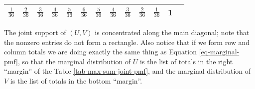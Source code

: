 \documentclass[]{book}
\numberwithin{equation}{chapter}
\numberwithin{figure}{chapter}
\theoremstyle{plain}
\theoremstyle{definition}
\theoremstyle{remark}
\theoremstyle{definition}
\theoremstyle{definition}
\theoremstyle{remark}
\begin{document}
\begin{longtable}[]{@{}lllllllllllll@{}}
\begin{minipage}[t]{0.05\columnwidth}
\(\frac{1}{36}\)\strut
\end{minipage} & \begin{minipage}[t]{0.05\columnwidth}\raggedright\strut
\(\frac{2}{36}\)\strut
\end{minipage} & \begin{minipage}[t]{0.05\columnwidth}\raggedright\strut
\(\frac{3}{36}\)\strut
\end{minipage} & \begin{minipage}[t]{0.05\columnwidth}\raggedright\strut
\(\frac{4}{36}\)\strut
\end{minipage} & \begin{minipage}[t]{0.05\columnwidth}\raggedright\strut
\(\frac{5}{36}\)\strut
\end{minipage} & \begin{minipage}[t]{0.05\columnwidth}\raggedright\strut
\(\frac{6}{36}\)\strut
\end{minipage} & \begin{minipage}[t]{0.05\columnwidth}\raggedright\strut
\(\frac{5}{36}\)\strut
\end{minipage} & \begin{minipage}[t]{0.05\columnwidth}\raggedright\strut
\(\frac{4}{36}\)\strut
\end{minipage} & \begin{minipage}[t]{0.05\columnwidth}\raggedright\strut
\(\frac{3}{36}\)\strut
\end{minipage} & \begin{minipage}[t]{0.05\columnwidth}\raggedright\strut
\(\frac{2}{36}\)\strut
\end{minipage} & \begin{minipage}[t]{0.05\columnwidth}\raggedright\strut
\(\frac{1}{36}\)\strut
\end{minipage} & \begin{minipage}[t]{0.05\columnwidth}\raggedright\strut
1\strut
\end{minipage}\tabularnewline
\bottomrule
\end{longtable}

The joint support of \((U,V)\) is concentrated along the main diagonal;
note that the nonzero entries do not form a rectangle. Also notice that
if we form row and column totals we are doing exactly the same thing as
Equation \eqref{eq-marginal-pmf}, so that the marginal distribution of
\(U\) is the list of totals in the right ``margin'' of the Table
\ref{tab-max-sum-joint-pmf}, and the marginal distribution of \(V\) is
the list of totals in the bottom ``margin''.
\end{document}
